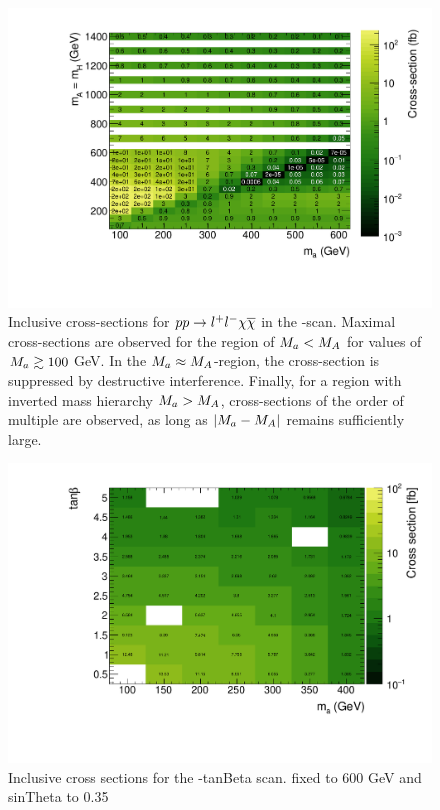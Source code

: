 \begin{figure}
\centering
\includegraphics[width=\textwidth]{texinputs/04_grid/figures/monoz/leptonic/xs_2d_inclusive_26300.pdf}
\caption{Inclusive cross-sections for $pp\rightarrow l^{+}l^{-}\chi\overline{\chi}$ in the \ma-\mA scan. Maximal cross-sections are observed for the region of $M_{a} < M_{A}$ for values of $M_{a}\gtrsim100$ GeV.  In the $M_{a}\approx M_{A}$-region, the cross-section is suppressed by destructive interference. Finally, for a region with inverted mass hierarchy $M_{a}>M_{A}$, cross-sections of the order of multiple \ifb are observed, as long as $|M_{a}-M_{A}|$ remains sufficiently large.}
\end{figure}


\begin{figure}
\centering
\includegraphics[width=\textwidth]{texinputs/04_grid/figures/monoz/leptonic/tanbma_xsec_ll.pdf}
\caption{Inclusive cross sections for the \ma-tanBeta scan.  \mA fixed to 600 GeV and sinTheta to 0.35} 
\end{figure}

